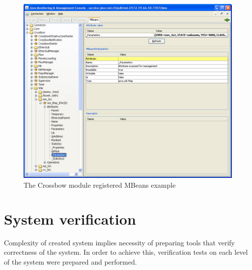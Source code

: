 \documentclass[11pt,openany]{book}
\begin{document}
        \begin{figure}[H]
          \centering
          \includegraphics[width=1.0\textwidth]{img/impl/jconsole.png}

          \caption{The Crossbow module registered MBeans example}
          \label{fig:impl:xbow-jconsole}
        \end{figure}




		

    \section{System verification}
    \label{sec:impl:verif}

  
      Complexity of created system implies necessity of preparing tools that verify correctness of the system. In order
      to achieve this, verification tests on each level of the system were prepared and performed.
\end{document}
